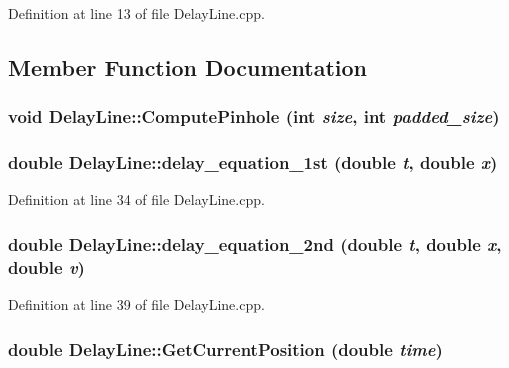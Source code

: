 Definition at line 13 of file DelayLine.cpp.



\subsection{Member Function Documentation}
\hypertarget{classDelayLine_aa11d93779cebcc3a57b920a5fcbda891}{
\subsubsection[{ComputePinhole}]{\setlength{\rightskip}{0pt plus 5cm}void DelayLine::ComputePinhole (int {\em size}, \/  int {\em padded\_\-size})}}
\label{classDelayLine_aa11d93779cebcc3a57b920a5fcbda891}
\hypertarget{classDelayLine_a138684e1f275e87508a1f71c6599f6f9}{
\subsubsection[{delay\_\-equation\_\-1st}]{\setlength{\rightskip}{0pt plus 5cm}double DelayLine::delay\_\-equation\_\-1st (double {\em t}, \/  double {\em x})}}
\label{classDelayLine_a138684e1f275e87508a1f71c6599f6f9}


Definition at line 34 of file DelayLine.cpp.

\hypertarget{classDelayLine_a49bab775499a10b2cae182b7706275bc}{
\subsubsection[{delay\_\-equation\_\-2nd}]{\setlength{\rightskip}{0pt plus 5cm}double DelayLine::delay\_\-equation\_\-2nd (double {\em t}, \/  double {\em x}, \/  double {\em v})}}
\label{classDelayLine_a49bab775499a10b2cae182b7706275bc}


Definition at line 39 of file DelayLine.cpp.

\hypertarget{classDelayLine_a230dfa049c8b66e41e028c15b63d23fa}{
\subsubsection[{GetCurrentPosition}]{\setlength{\rightskip}{0pt plus 5cm}double DelayLine::GetCurrentPosition (double {\em time})}}
\label{classDelayLine_a230dfa049c8b66e41e028c15b63d23fa}


